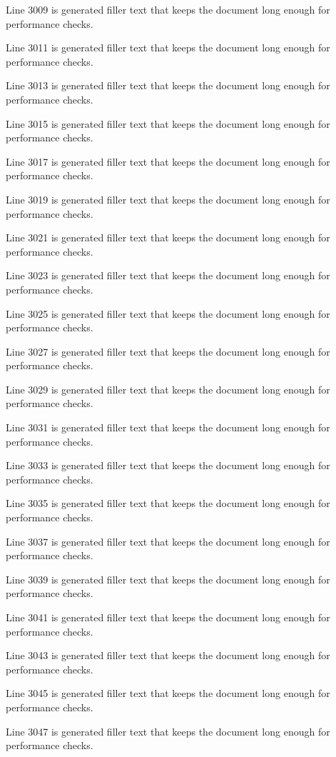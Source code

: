 Line 3009 is generated filler text that keeps the document long enough for performance checks.

Line 3011 is generated filler text that keeps the document long enough for performance checks.

Line 3013 is generated filler text that keeps the document long enough for performance checks.

Line 3015 is generated filler text that keeps the document long enough for performance checks.

Line 3017 is generated filler text that keeps the document long enough for performance checks.

Line 3019 is generated filler text that keeps the document long enough for performance checks.

Line 3021 is generated filler text that keeps the document long enough for performance checks.

Line 3023 is generated filler text that keeps the document long enough for performance checks.

Line 3025 is generated filler text that keeps the document long enough for performance checks.

Line 3027 is generated filler text that keeps the document long enough for performance checks.

Line 3029 is generated filler text that keeps the document long enough for performance checks.

Line 3031 is generated filler text that keeps the document long enough for performance checks.

Line 3033 is generated filler text that keeps the document long enough for performance checks.

Line 3035 is generated filler text that keeps the document long enough for performance checks.

Line 3037 is generated filler text that keeps the document long enough for performance checks.

Line 3039 is generated filler text that keeps the document long enough for performance checks.

Line 3041 is generated filler text that keeps the document long enough for performance checks.

Line 3043 is generated filler text that keeps the document long enough for performance checks.

Line 3045 is generated filler text that keeps the document long enough for performance checks.

Line 3047 is generated filler text that keeps the document long enough for performance checks.

